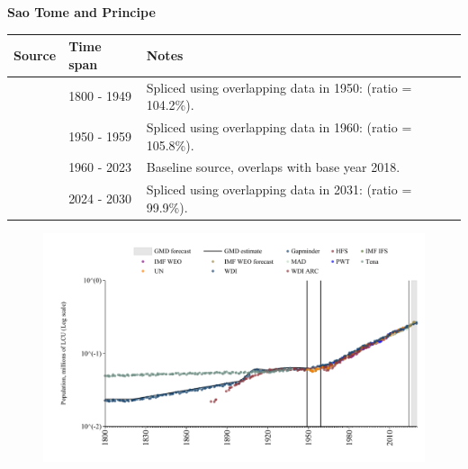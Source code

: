 \documentclass[12pt,a4paper,landscape]{article}
\begin{document}
\begin{adjustbox}{max totalsize={\paperwidth}{\paperheight},center}
\begin{minipage}[t][\textheight][t]{\textwidth}
\vspace*{0.5cm}
{}
\begin{center}
{\Large\bfseries Sao Tome and Principe}
\end{center}
\vspace{0.5cm}
\begin{table}[H]
\centering
\small
\begin{tabular}{|l|l|l|}
\hline
\textbf{Source} & \textbf{Time span} & \textbf{Notes} \\
\hline
\rowcolor{white}\cite{Gapminder}& 1800 - 1949 &Spliced using overlapping data in 1950: (ratio = 104.2\%).\\
\rowcolor{lightgray}\cite{IMF_IFS}& 1950 - 1959 &Spliced using overlapping data in 1960: (ratio = 105.8\%).\\
\rowcolor{white}\cite{WDI}& 1960 - 2023 &Baseline source, overlaps with base year 2018.\\
\rowcolor{lightgray}\cite{Gapminder}& 2024 - 2030 &Spliced using overlapping data in 2031: (ratio = 99.9\%).\\
\hline
\end{tabular}
\end{table}
\begin{figure}[H]
\centering
\includegraphics[width=\textwidth,height=0.6\textheight,keepaspectratio]{graphs/STP_pop.pdf}
\end{figure}
\end{minipage}
\end{adjustbox}
\end{document}
